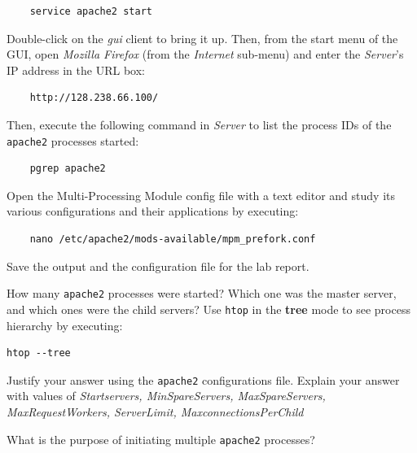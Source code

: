 \documentclass{UTNetLab}
\begin{document}
	\begin{lstlisting}
	service apache2 start
	\end{lstlisting}

    Double-click on the \textit{gui} client to bring it up. Then, from the start menu of the GUI, open \textit{Mozilla Firefox} (from the \textit{Internet} sub-menu) and enter the \textit{Server}'s IP address in the URL box:
    
    \begin{lstlisting}
    http://128.238.66.100/
    \end{lstlisting}

    Then, execute the following command in \textit{Server} to list the process IDs of the \lstinline{apache2} processes started:
    
    \begin{lstlisting}
	pgrep apache2
    \end{lstlisting}
    
    Open the Multi-Processing Module config file with a text editor and study its various configurations and their applications by executing: 
    
    \begin{lstlisting}
    nano /etc/apache2/mods-available/mpm_prefork.conf
    \end{lstlisting}
    
    Save the output and the configuration file for the lab report.
    
    \begin{report}
    \item How many \lstinline{apache2} processes were started?
    Which one was the master server, and which ones were the child servers? Use \lstinline{htop} in the \textbf{tree} mode to see process hierarchy by executing:
    
    \begin{lstlisting}[xleftmargin=0.05in]
	htop --tree
    \end{lstlisting}
    
    Justify your answer using the \lstinline{apache2} configurations file. Explain your answer with values of \textit{Startservers, MinSpareServers, MaxSpareServers, MaxRequestWorkers, ServerLimit, MaxconnectionsPerChild}
    
    \item What is the purpose of initiating multiple \lstinline{apache2} processes? 
    \end{report}
\end{document}
